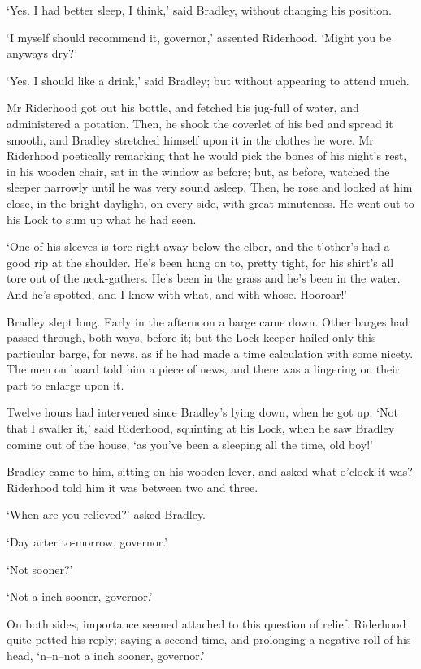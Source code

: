 ‘Yes. I had better sleep, I think,’ said Bradley, without changing his
position.

‘I myself should recommend it, governor,’ assented Riderhood. ‘Might you
be anyways dry?’

‘Yes. I should like a drink,’ said Bradley; but without appearing to
attend much.

Mr Riderhood got out his bottle, and fetched his jug-full of water,
and administered a potation. Then, he shook the coverlet of his bed and
spread it smooth, and Bradley stretched himself upon it in the clothes
he wore. Mr Riderhood poetically remarking that he would pick the bones
of his night’s rest, in his wooden chair, sat in the window as before;
but, as before, watched the sleeper narrowly until he was very sound
asleep. Then, he rose and looked at him close, in the bright daylight,
on every side, with great minuteness. He went out to his Lock to sum up
what he had seen.

‘One of his sleeves is tore right away below the elber, and the
t’other’s had a good rip at the shoulder. He’s been hung on to, pretty
tight, for his shirt’s all tore out of the neck-gathers. He’s been in
the grass and he’s been in the water. And he’s spotted, and I know with
what, and with whose. Hooroar!’

Bradley slept long. Early in the afternoon a barge came down. Other
barges had passed through, both ways, before it; but the Lock-keeper
hailed only this particular barge, for news, as if he had made a time
calculation with some nicety. The men on board told him a piece of news,
and there was a lingering on their part to enlarge upon it.

Twelve hours had intervened since Bradley’s lying down, when he got up.
‘Not that I swaller it,’ said Riderhood, squinting at his Lock, when he
saw Bradley coming out of the house, ‘as you’ve been a sleeping all the
time, old boy!’

Bradley came to him, sitting on his wooden lever, and asked what o’clock
it was? Riderhood told him it was between two and three.

‘When are you relieved?’ asked Bradley.

‘Day arter to-morrow, governor.’

‘Not sooner?’

‘Not a inch sooner, governor.’

On both sides, importance seemed attached to this question of relief.
Riderhood quite petted his reply; saying a second time, and prolonging a
negative roll of his head, ‘n--n--not a inch sooner, governor.’

